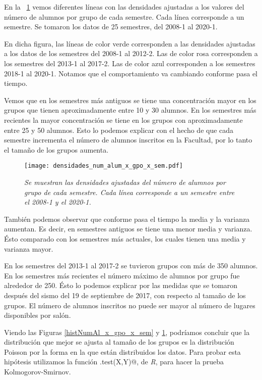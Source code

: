 En la \figurename{~\ref{densidadesNumAl_x_gpo_x_sem}} vemos diferentes líneas con las densidades ajustadas a los valores del número de alumnos por grupo de cada semestre. Cada línea corresponde a un semestre. Se tomaron los datos de 25 semestres, del 2008-1 al 2020-1.

En dicha figura, las líneas de color verde corresponden a las densidades ajustadas a los datos de los semestres del 2008-1 al 2012-2. Las de color rosa corresponden a los semestres del 2013-1 al 2017-2. Las de color azul corresponden a los semestres 2018-1 al 2020-1. Notamos que el comportamiento va cambiando conforme pasa el tiempo.

Vemos que en los semestres más antiguos se tiene una concentración mayor en los grupos que tienen aproximadamente entre 10 y 30 alumnos. En los semestres más recientes la mayor concentración se tiene en los grupos con aproximadamente entre 25 y 50 alumnos. Esto lo podemos explicar con el hecho de que cada semestre incrementa el número de alumnos inscritos en la Facultad, por lo tanto el tamaño de los grupos aumenta.

\begin{figure}[H]
\centering
\texttt{[image: densidades\_num\_alum\_x\_gpo\_x\_sem.pdf]} %
\caption[\textit{Densidades del número de alumnos por grupo de cada semestre}]{\textit{Se muestran las densidades ajustadas del número de alumnos por grupo de cada semestre. Cada línea corresponde a un semestre entre el 2008-1 y el 2020-1.}}\label{densidadesNumAl_x_gpo_x_sem}
\end{figure}

También podemos observar que conforme pasa el tiempo la media y la varianza aumentan. Es decir, en semestres antiguos se tiene una menor media y varianza. Ésto comparado con los semestres más actuales, los cuales tienen una media y varianza mayor.

En los semestres del 2013-1 al 2017-2 se tuvieron grupos con más de 350 alumnos. En los semestres más recientes el número máximo de alumnos por grupo fue alrededor de 250. Ésto lo podemos explicar por las medidas que se tomaron después del sismo del 19 de septiembre de 2017, con respecto al tamaño de los grupos. El número de alumnos inscritos no puede ser mayor al número de lugares disponibles por salón.

Viendo las Figuras \ref{histNumAl_x_gpo_x_sem} y \ref{densidadesNumAl_x_gpo_x_sem}, podríamos concluir que la distribución que mejor se ajusta al tamaño de los grupos es la distribución Poisson por la forma en la que están distribuidos los datos. Para probar esta hipótesis utilizamos la función \verb@ks.test(X,Y)@, de \textit{R}, para hacer la prueba Kolmogorov-Smirnov.


